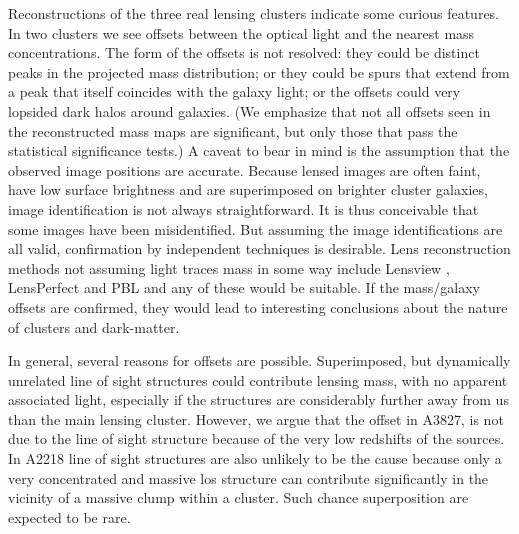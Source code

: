 \documentclass[
  11pt,
  twoside,
  openright,
  titlepage,
  headings=optiontoheadandtoc
]{scrbook}
\begin{document}
Reconstructions of the three real lensing clusters indicate some
curious features.  In two clusters we see offsets between the optical
light and the nearest mass concentrations.  The form of the offsets is
not resolved: they could be distinct peaks in the projected mass
distribution; or they could be spurs that extend from a peak that
itself coincides with the galaxy light; or the offsets could very
lopsided dark halos around galaxies.  (We emphasize that not all
offsets seen in the reconstructed mass maps are significant, but only
those that pass the statistical significance tests.)  A caveat to bear
in mind is the assumption that the observed image positions are
accurate. Because lensed images are often faint, have low surface
brightness and are superimposed on brighter cluster galaxies, image
identification is not always straightforward. It is thus conceivable
that some images have been misidentified.  But assuming the image
identifications are all valid, confirmation by independent techniques
is desirable.  Lens reconstruction methods not assuming light traces
mass in some way include Lensview \citep{2006MNRAS.372.1187W},
LensPerfect \citep{2008ApJ...681..814C} and PBL
\citep{2008ApJ...687...39D} and any of these would be suitable.  If
the mass/galaxy offsets are confirmed, they would lead to interesting
conclusions about the nature of clusters and dark-matter.

In general, several reasons for offsets are possible. Superimposed, but dynamically unrelated 
line of sight structures could contribute lensing mass, with no apparent associated light, 
especially if the structures are considerably further away from us than the main lensing cluster.  
However, we argue that the offset in A3827,  is not due to the line of sight structure
because of the very low redshifts of the sources. In A2218 line of sight structures are also 
unlikely to be the cause because only a very concentrated and massive los structure can 
contribute significantly in the vicinity of a massive clump within a cluster. Such chance
superposition are expected to be rare. 
\end{document}
